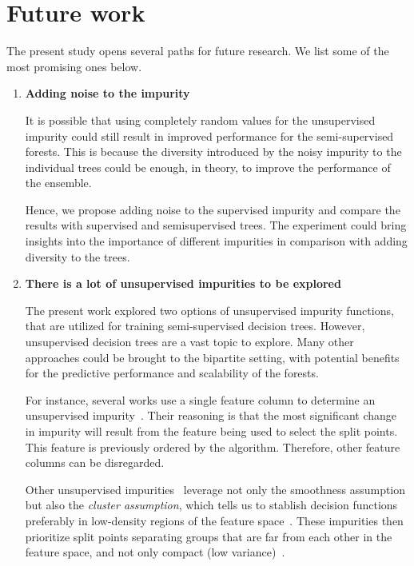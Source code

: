 \section{Future work}

The present study opens several paths for future research. We list some of the most promising ones below.

\begin{enumerate}
    \item \textbf{Adding noise to the impurity}

    It is possible that using completely random values for the unsupervised impurity could still result in improved performance for the semi-supervised forests. This is because the diversity introduced by the noisy impurity to the individual trees could be enough, in theory, to improve the performance of the ensemble.

    Hence, we propose adding noise to the supervised impurity and compare the results with supervised and semisupervised trees. The experiment could bring insights into the importance of different impurities in comparison with adding diversity to the trees.


    \item \textbf{There is a lot of unsupervised impurities to be explored}

    The present work explored two options of unsupervised impurity functions, that are utilized for training semi-supervised decision trees. However, unsupervised decision trees are a vast topic to explore. Many other approaches could be brought to the bipartite setting, with potential benefits for the predictive performance and scalability of the forests.

    For instance, several works use a single feature column to determine an unsupervised impurity~\cite{loyola-gonzalez2020explainable}.  %
    Their reasoning is that the most significant change in impurity will result from the feature being used to select the split points. This feature is previously ordered by the algorithm. Therefore, other feature columns can be disregarded.
    
    Other unsupervised impurities~\cite{loyola-gonzalez2020explainable} leverage not only the smoothness assumption but also the \emph{cluster assumption}, which tells us to stablish decision functions preferably in low-density regions of the feature space~\cite{chapelle2006semisupervised,vanengelen2020survey}. These impurities then prioritize split points separating groups that are far from each other in the feature space, and not only compact (low variance)~\cite{loyola-gonzalez2020explainable}.


\end{enumerate}
